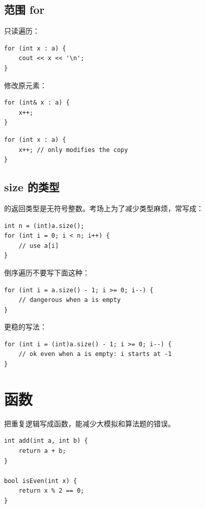 \subsection{范围 for}

只读遍历：

\begin{lstlisting}
for (int x : a) {
    cout << x << '\n';
}
\end{lstlisting}

修改原元素：

\begin{lstlisting}
for (int& x : a) {
    x++;
}
\end{lstlisting}


\begin{lstlisting}
for (int x : a) {
    x++; // only modifies the copy
}
\end{lstlisting}

\subsection{size 的类型}

 的返回类型是无符号整数。考场上为了减少类型麻烦，常写成：

\begin{lstlisting}
int n = (int)a.size();
for (int i = 0; i < n; i++) {
    // use a[i]
}
\end{lstlisting}

倒序遍历不要写下面这种：

\begin{lstlisting}
for (int i = a.size() - 1; i >= 0; i--) {
    // dangerous when a is empty
}
\end{lstlisting}

更稳的写法：

\begin{lstlisting}
for (int i = (int)a.size() - 1; i >= 0; i--) {
    // ok even when a is empty: i starts at -1
}
\end{lstlisting}

\section{函数}\label{sec:04-9}

把重复逻辑写成函数，能减少大模拟和算法题的错误。

\begin{lstlisting}
int add(int a, int b) {
    return a + b;
}

bool isEven(int x) {
    return x % 2 == 0;
}
\end{lstlisting}

